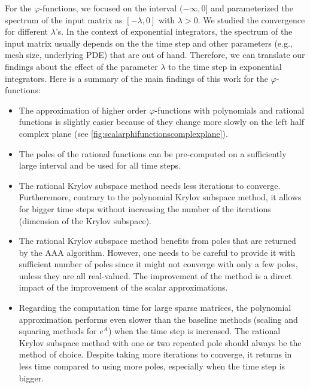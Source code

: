 For the $\varphi$-functions, we focused on the interval $(-\infty, 0]$ and parameterized
the spectrum of the input matrix as $[-\lambda, 0]$ with $\lambda > 0$. We studied the
convergence for different $\lambda$'s.
In the context of exponential integrators, the spectrum of the input matrix usually
depends on the the time step and other parameters (e.g., mesh size, underlying PDE)
that are out of hand.
Therefore, we can translate our findings about the effect of the parameter $\lambda$ to
the time step in exponential integrators.
Here is a summary of the main findings of this work for the $\varphi$-functions:
\begin{itemize}
    \item The approximation of higher order $\varphi$-functions with polynomials
        and rational functions is slightly easier because of they change more slowly
        on the left half complex plane (see \autoref{fig:scalarphifunctionscomplexplane}).
    \item The poles of the rational functions can be pre-computed on a sufficiently
        large interval and be used for all time steps.
    \item The rational Krylov subspace method needs less iterations to converge.
        Furtheremore, contrary to the polynomial Krylov subspace method, it allows for
        bigger time steps without increasing the number of the iterations
        (dimension of the Krylov subspace).
    \item The rational Krylov subspace method benefits from poles that are returned by
        the AAA algorithm.
        However, one needs to be careful to provide it with sufficient number of poles
        since it might not converge with only a few poles, unless they are all real-valued.
        The improvement of the method is a direct impact of the improvement of the scalar
        approximations.
    \item Regarding the computation time for large sparse matrices, the polynomial
        approximation performs even slower than the baseline methods
        (scaling and squaring methods for $e^A$) when the time step is increased.
        The rational Krylov subspace method with one or two repeated pole should always
        be the method of choice. Despite taking more iterations to converge, it returns
        in less time compared to using more poles, especially when the time step is bigger.
\end{itemize}

